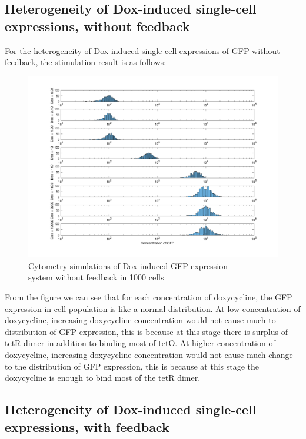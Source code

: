 \subsection{Heterogeneity of Dox-induced single-cell expressions, without feedback}

For the heterogeneity of Dox-induced single-cell expressions of GFP without feedback, the stimulation result is as follows:

\begin{figure}[H]
\centering
\includegraphics[width=1.0\linewidth]{Figures/Q3_1.png}
\caption{Cytometry simulations of Dox-induced GFP expression \\ system without feedback in 1000 cells}
\label{part_3_1}
\end{figure}

From the ﬁgure we can see that for each concentration of doxycycline, the GFP expression in cell population is like a normal distribution. At low concentration of doxycycline, increasing doxycycline concentration would not cause much to distribution of GFP expression, this is because at this stage there is surplus of tetR dimer in addition to binding most of tetO. At higher concentration of doxycycline, increasing doxycycline concentration would not cause much change to the distribution of GFP expression, this is because at this stage the doxycycline is enough to bind most of the tetR dimer.

\subsection{Heterogeneity of Dox-induced single-cell expressions, with feedback}

